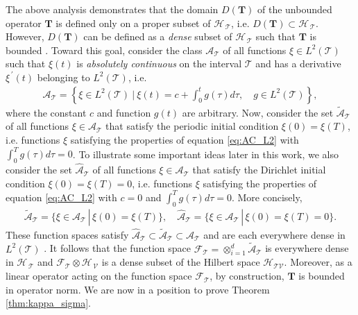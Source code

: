 \documentclass[11pt]{amsart}
\newcommand{\Tb}{\mathbf{T}}
\newcommand{\Tc}{\mathcal{T}}
\newcommand{\Vc}{\mathcal{V}}
\newcommand{\Hs}{\mathscr{H}}
\newcommand{\As}{\mathscr{A}}
\newcommand{\Fs}{\mathscr{F}}
\begin{document}
The above analysis demonstrates that the domain $D(\Tb)$ of the
unbounded operator $\Tb$ is defined only on a proper subset of $\Hs_{\,\Tc}$,
i.e. $D(\Tb)\subset\Hs_{\,\Tc}$. However, $D(\Tb)$ can be defined as a \emph{dense}
subset of $\Hs_{\,\Tc}$ such that $\Tb$ is bounded
\cite{Reed-1980,Stone:64}. Toward this goal, consider the class
$\As_{\Tc}$ of all functions $\xi\in L^2(\Tc)$ such that $\xi(t)$ is
\emph{absolutely continuous} \cite{Royden:1988:RA} on the interval
$\Tc$ and has a derivative $\xi^{\,\prime}(t)$ belonging to $L^2(\Tc)$,
i.e. \cite{Stone:64,Royden:1988:RA}   
%
\begin{align}\label{eq:AC_L2}
  \As_{\Tc}=
     \left\{
       \xi\in L^2(\Tc) \ \Big| \ \xi(t)=c+\int_0^tg(\tau)d\tau,
       \quad  g\in L^2(\Tc)
     \right\},
\end{align}
%
where the constant $c$ and function $g(t)$ are
arbitrary. Now, consider the set $\tilde{\As}_{\Tc}$ of all
functions $\xi\in\As_{\Tc}$ that satisfy the periodic initial condition
$\xi(0)=\xi(T)$, i.e. functions $\xi$ satisfying the properties of 
equation \eqref{eq:AC_L2} with $\int_0^Tg(\tau)d\tau=0$. To illustrate some
important ideas later in this work, we also consider the
set $\hat{\As}_{\Tc}$ of all functions $\xi\in\As_{\Tc}$ that satisfy the
Dirichlet initial condition $\xi(0)=\xi(T)=0$, i.e. functions $\xi$
satisfying the properties of equation \eqref{eq:AC_L2} with $c=0$ and
$\int_0^Tg(\tau)d\tau=0$. More concisely, 
%
\begin{align}\label{eq:AC_BC}
  \tilde{\As}_{\Tc}=\{\xi\in\As_{\Tc} \,|\, \xi(0)=\xi(T)\}, \quad
  \hat{\As}_{\Tc}=\{\xi\in\As_{\Tc} \,|\, \xi(0)=\xi(T)=0\}.
\end{align}
%
These function spaces satisfy
$\hat{\As}_{\Tc}\subset\tilde{\As}_{\Tc}\subset\As_{\Tc}$ and are each everywhere
dense in $L^2(\Tc)$ \cite{Stone:64}. It follows that the function space
$\Fs_{\Tc}=\otimes_{i=1}^d\tilde{\As}_{\Tc}$ is everywhere dense in
$\Hs_{\,\Tc}$ and $\Fs_{\Tc}\otimes\Hs_{\,\Vc}$ is a dense subset of the
Hilbert space $\Hs_{\Tc\Vc}$. Moreover, as a linear operator acting on
the function space $\Fs_{\Tc}$, by construction, $\Tb$ is bounded in
operator norm. We are now in a position to prove Theorem
\ref{thm:kappa_sigma}. 
\end{document}
